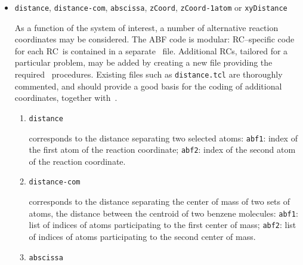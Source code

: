 \begin{itemize}
\setlength{\itemsep}{0.4cm}

\item
{}
{{\tt distance}, {\tt distance-com}, {\tt abscissa}, {\tt zCoord}, 
{\tt zCoord-1atom} or {\tt xyDistance}}
{As a function of the system of interest, a number of alternative
 reaction coordinates may be considered. The ABF code is modular:
 RC--specific code for each RC\ is contained in a separate \tcl\
 file.
 Additional RCs, tailored for a particular problem, may be added
 by creating a new file providing the required \tcl\ procedures.
 Existing files such as {\tt distance.tcl} are thoroughly
 commented, and should provide a good basis for the coding of
 additional coordinates, together with~\cite{heni_04_1}.
 \begin{enumerate}
 \renewcommand{\itemsep}{0.4cm}
 \renewcommand{\labelenumi}{(\arabic{enumi})}
 \item
 {\tt distance} \hfill
 \begin{minipage}[t]{10.0cm}
                    corresponds to the distance separating two selected
                    atoms:
                    \newline
                    {\tt abf1}: index of the
                                first atom of the reaction coordinate;
                    \newline
                    {\tt abf2}: index of the
                                second atom of the reaction coordinate.
 \end{minipage}
 \item
 {\tt distance-com} \hfill
 \begin{minipage}[t]{10.0cm}
                    corresponds to the distance separating the center of
                    mass of two sets of atoms, \eg the distance between the
                    centroid of two benzene molecules:
                    \newline
                    {\tt abf1}: list of indices of atoms participating
                                to the first center of mass;
                    \newline
                    {\tt abf2}: list of indices of atoms participating
                                to the second center of mass.
 \end{minipage}
 \item
 {\tt abscissa} \hfill
 \begin{minipage}[t]{10.0cm}

\end{minipage}
\end{enumerate}}
\end{itemize}
